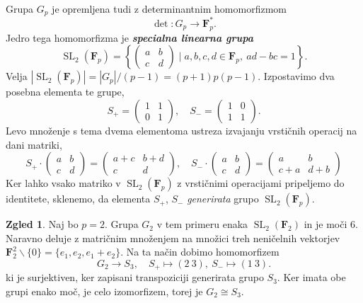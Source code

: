 \documentclass[11pt]{book}
\def\FF{\mathbf{F}}
\DeclareMathOperator\SL{SL}
\def\definicija{\color{rdeca}\bf\em}
\theoremstyle{definition}
\theoremstyle{zgled}
\newtheorem*{zgled}{Zgled}
\theoremstyle{odprtproblem}
\theoremstyle{domacanaloga}
\theoremstyle{izrek}
\begin{document}
Grupa $G_p$ je opremljena tudi z determinantnim homomorfizmom
\[
    \det \colon G_p \to \FF_p^*.
\]
Jedro tega homomorfizma je {\definicija specialna linearna grupa}
\[
    {\textstyle \SL_2(\FF_p)} = \left\{ \begin{pmatrix} a & b \\ c & d \end{pmatrix} \mid a,b,c,d \in \FF_p, \ ad - bc = 1 \right\}.
\]
Velja $|\SL_2(\FF_p)| = |G_p|/(p-1) = (p+1)p(p-1)$. Izpostavimo dva posebna elementa te grupe,
\[
    S_+ = \begin{pmatrix}
        1 & 1 \\ 0 & 1
    \end{pmatrix}, \quad
    S_- = \begin{pmatrix}
        1 & 0 \\ 1 & 1
    \end{pmatrix}.
\]
Levo množenje s tema dvema elementoma ustreza izvajanju vrstičnih operacij na dani matriki,
\[
    S_+ \cdot 
    \begin{pmatrix}
        a & b \\ c & d
    \end{pmatrix}
    = 
    \begin{pmatrix}
        a+c & b+d \\ c & d
    \end{pmatrix}, \quad
    S_- \cdot 
    \begin{pmatrix}
        a & b \\ c & d
    \end{pmatrix}
    = 
    \begin{pmatrix}
        a & b \\ c+a & d+b
    \end{pmatrix}
\]
Ker lahko vsako matriko v $\SL_2(\FF_p)$ z vrstičnimi operacijami pripeljemo do identitete, sklenemo, da elementa $S_+$, $S_-$ \emph{generirata} grupo $\SL_2(\FF_p)$. 

\begin{zgled}
    Naj bo $p = 2$. Grupa $G_2$ v tem primeru enaka $\SL_2(\FF_2)$ in je moči $6$. Naravno deluje z matričnim množenjem na množici treh neničelnih vektorjev $\FF_2^2 \backslash \{ 0 \} = \{ e_1, e_2, e_1 + e_2 \}$. Na ta način dobimo homomorfizem
    \[
        G_2 \to S_3, \quad
        S_+ \mapsto (2 \ 3), \ 
        S_- \mapsto (1 \ 3).
        \]
    ki je surjektiven, ker zapisani transpoziciji generirata grupo $S_3$. Ker imata obe grupi enako moč, je celo izomorfizem, torej je $G_2 \cong S_3$.
\end{zgled}
\end{document}
